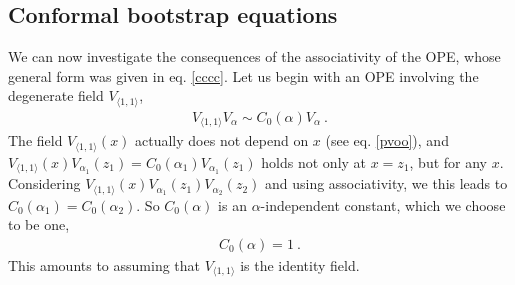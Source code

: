 \documentclass[12pt, a4paper, notitlepage, twoside]{report}
\numberwithin{equation}{section}
\theoremstyle{break}
\begin{document}
\subsection{Conformal bootstrap equations \label{seccbe}}

We can now investigate the consequences of the associativity of the OPE, whose general form was given in eq. \eqref{cccc}.
Let us begin with an OPE involving the degenerate field  $V_{\langle 1,1 \rangle}$,
\begin{align}
\boxed{V_{\langle 1,1 \rangle}V_\alpha \sim  C_0(\alpha) V_\alpha} \ .
\end{align}
The field $V_{\langle 1,1 \rangle}(x)$ actually does not depend on $x$ (see eq. \eqref{pvoo}), and $V_{\langle 1,1 \rangle}(x)V_{\alpha_1}(z_1) = C_0(\alpha_1) V_{\alpha_1}(z_1)$ holds not only at $x=z_1$, but for any $x$.
Considering  
$V_{\langle 1,1 \rangle}(x)V_{\alpha_1}(z_1)V_{\alpha_2}(z_2)$ and using associativity, we this leads to $C_0(\alpha_1)=C_0(\alpha_2)$.
So $C_0(\alpha)$ 
is an $\alpha$-independent constant, which we choose to be one,
\begin{align}
\boxed{ C_0(\alpha) = 1}\ .
\label{cza}
\end{align}
This amounts to assuming that $V_{\langle 1,1 \rangle}$ is the identity field. 
\end{document}
